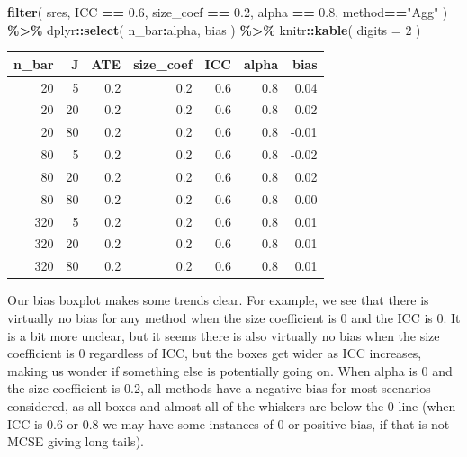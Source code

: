 \documentclass[
]{book}
\newenvironment{Shaded}{\begin{snugshade}}{\end{snugshade}}
\newcommand{\AttributeTok}[1]{\textcolor[rgb]{0.13,0.29,0.53}{#1}}
\newcommand{\DecValTok}[1]{\textcolor[rgb]{0.00,0.00,0.81}{#1}}
\newcommand{\FloatTok}[1]{\textcolor[rgb]{0.00,0.00,0.81}{#1}}
\newcommand{\FunctionTok}[1]{\textcolor[rgb]{0.13,0.29,0.53}{\textbf{#1}}}
\newcommand{\NormalTok}[1]{#1}
\newcommand{\SpecialCharTok}[1]{\textcolor[rgb]{0.81,0.36,0.00}{\textbf{#1}}}
\newcommand{\StringTok}[1]{\textcolor[rgb]{0.31,0.60,0.02}{#1}}
\begin{document}
\begin{Shaded}
\begin{Highlighting}[]
\FunctionTok{filter}\NormalTok{( sres, }
\NormalTok{        ICC }\SpecialCharTok{==} \FloatTok{0.6}\NormalTok{, }
\NormalTok{        size\_coef }\SpecialCharTok{==} \FloatTok{0.2}\NormalTok{,}
\NormalTok{        alpha }\SpecialCharTok{==} \FloatTok{0.8}\NormalTok{, method}\SpecialCharTok{==}\StringTok{"Agg"}\NormalTok{ ) }\SpecialCharTok{\%\textgreater{}\%}
\NormalTok{  dplyr}\SpecialCharTok{::}\FunctionTok{select}\NormalTok{( n\_bar}\SpecialCharTok{:}\NormalTok{alpha, bias ) }\SpecialCharTok{\%\textgreater{}\%}
\NormalTok{  knitr}\SpecialCharTok{::}\FunctionTok{kable}\NormalTok{( }\AttributeTok{digits =} \DecValTok{2}\NormalTok{ )}
\end{Highlighting}
\end{Shaded}

\begin{tabular}{r|r|r|r|r|r|r}
\hline
n\_bar & J & ATE & size\_coef & ICC & alpha & bias\\
\hline
20 & 5 & 0.2 & 0.2 & 0.6 & 0.8 & 0.04\\
\hline
20 & 20 & 0.2 & 0.2 & 0.6 & 0.8 & 0.02\\
\hline
20 & 80 & 0.2 & 0.2 & 0.6 & 0.8 & -0.01\\
\hline
80 & 5 & 0.2 & 0.2 & 0.6 & 0.8 & -0.02\\
\hline
80 & 20 & 0.2 & 0.2 & 0.6 & 0.8 & 0.02\\
\hline
80 & 80 & 0.2 & 0.2 & 0.6 & 0.8 & 0.00\\
\hline
320 & 5 & 0.2 & 0.2 & 0.6 & 0.8 & 0.01\\
\hline
320 & 20 & 0.2 & 0.2 & 0.6 & 0.8 & 0.01\\
\hline
320 & 80 & 0.2 & 0.2 & 0.6 & 0.8 & 0.01\\
\hline
\end{tabular}

Our bias boxplot makes some trends clear.
For example, we see that there is virtually no bias for any method when the size coefficient is 0 and the ICC is 0.
It is a bit more unclear, but it seems there is also virtually no bias when the size coefficient is 0 regardless of ICC, but the boxes get wider as ICC increases, making us wonder if something else is potentially going on.
When alpha is 0 and the size coefficient is 0.2, all methods have a negative bias for most scenarios considered, as all boxes and almost all of the whiskers are below the 0 line (when ICC is 0.6 or 0.8 we may have some instances of 0 or positive bias, if that is not MCSE giving long tails).
\end{document}
